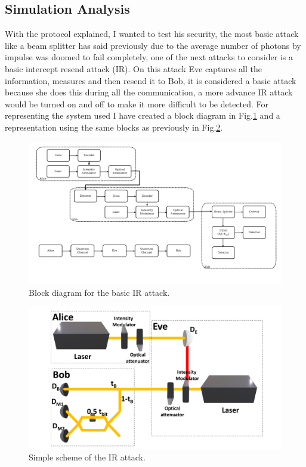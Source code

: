 \begin{refsection}
\subsection{Simulation Analysis}

With the protocol explained, I wanted to test his security, the most basic attack like a beam splitter has said previously due to the average number of photons by impulse was doomed to fail completely, one of the next attacks to consider is a basic intercept resend attack (IR). On this attack Eve captures all the information, measures and then resend it to Bob, it is considered a basic attack because she does this during all the communication, a more advance IR attack would be turned on and off to make it more difficult to be detected. For representing the system used I have created a block diagram in Fig.\ref{fig:bloc} and a representation using the same blocks as previously in Fig.\ref{fig:E}.

\begin{figure}[h]
\centering
\includegraphics[width=1\linewidth]{./sdf/tq_76558_cow_protocol/slides/figures/Diagrama_de_blocos.pdf}
\caption{Block diagram for the basic IR attack.}
\label{fig:bloc}
\end{figure}

\begin{figure}[h]
\centering
\includegraphics[width=1\linewidth]{./sdf/tq_76558_cow_protocol/slides/figures/E.pdf}
\caption{Simple scheme of the IR attack.}
\label{fig:E}
\end{figure}


\end{refsection}
